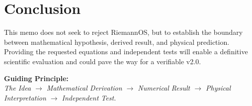 \documentclass[11pt,a4paper]{article}
\begin{document}
\section{Conclusion}
This memo does not seek to reject RiemannOS, but to establish the boundary between mathematical hypothesis, derived result, and physical prediction. Providing the requested equations and independent tests will enable a definitive scientific evaluation and could pave the way for a verifiable v2.0.

\vspace{0.5cm}
\noindent \textbf{Guiding Principle:}\\
\textit{The Idea $\rightarrow$ Mathematical Derivation $\rightarrow$ Numerical Result $\rightarrow$ Physical Interpretation $\rightarrow$ Independent Test.}
\end{document}
